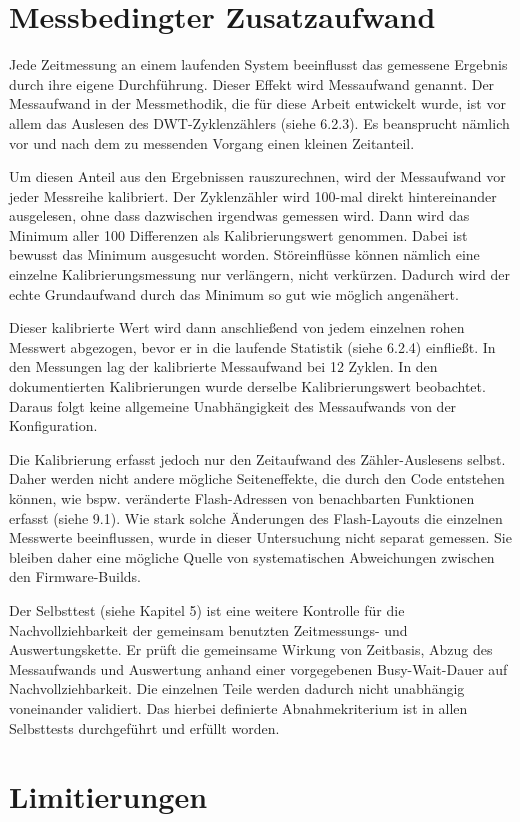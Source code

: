 \section{Messbedingter Zusatzaufwand}
Jede Zeitmessung an einem laufenden System beeinflusst das gemessene Ergebnis durch ihre eigene Durchführung. Dieser Effekt wird Messaufwand genannt. Der Messaufwand in der Messmethodik, die für diese Arbeit entwickelt wurde, ist vor allem das Auslesen des DWT-Zyklenzählers (siehe 6.2.3). Es beansprucht nämlich vor und nach dem zu messenden Vorgang einen kleinen Zeitanteil.

Um diesen Anteil aus den Ergebnissen rauszurechnen, wird der Messaufwand vor jeder Messreihe kalibriert. Der Zyklenzähler wird 100-mal direkt hintereinander ausgelesen, ohne dass dazwischen irgendwas gemessen wird. Dann wird das Minimum aller 100 Differenzen als Kalibrierungswert genommen. Dabei ist bewusst das Minimum ausgesucht worden. Störeinflüsse können nämlich eine einzelne Kalibrierungsmessung nur verlängern, nicht verkürzen. Dadurch wird der echte Grundaufwand durch das Minimum so gut wie möglich angenähert.

Dieser kalibrierte Wert wird dann anschließend von jedem einzelnen rohen Messwert abgezogen, bevor er in die laufende Statistik (siehe 6.2.4) einfließt. In den Messungen lag der kalibrierte Messaufwand bei 12 Zyklen. In den dokumentierten Kalibrierungen wurde derselbe Kalibrierungswert beobachtet. Daraus folgt keine allgemeine Unabhängigkeit des Messaufwands von der Konfiguration.

Die Kalibrierung erfasst jedoch nur den Zeitaufwand des Zähler-Auslesens selbst. Daher werden nicht andere mögliche Seiteneffekte, die durch den Code entstehen können, wie bspw. veränderte Flash-Adressen von benachbarten Funktionen erfasst (siehe 9.1). Wie stark solche Änderungen des Flash-Layouts die einzelnen Messwerte beeinflussen, wurde in dieser Untersuchung nicht separat gemessen. Sie bleiben daher eine mögliche Quelle von systematischen Abweichungen zwischen den Firmware-Builds.

Der Selbsttest (siehe Kapitel 5) ist eine weitere Kontrolle für die Nachvollziehbarkeit der gemeinsam benutzten Zeitmessungs- und Auswertungskette. Er prüft die gemeinsame Wirkung von Zeitbasis, Abzug des Messaufwands und Auswertung anhand einer vorgegebenen Busy-Wait-Dauer auf Nachvollziehbarkeit. Die einzelnen Teile werden dadurch nicht unabhängig voneinander validiert. Das hierbei definierte Abnahmekriterium ist in allen Selbsttests durchgeführt und erfüllt worden.

\section{Limitierungen}
